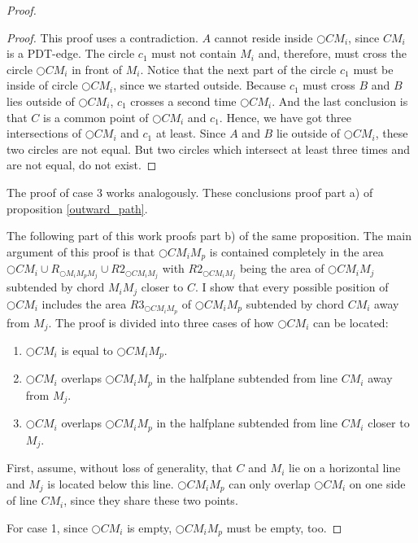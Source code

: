 \begin{proof}
\begin{proof}
This proof uses a contradiction. %
$A $ cannot reside inside $\bigcirc{CM_i} $, since $CM_i $ is a PDT-edge.
The circle $c_1 $ must not contain $M_i $ and, therefore, must cross the circle $\bigcirc{CM_i} $ in front of $M_i $.
Notice that the next part of the circle $c_1 $ must be inside of circle $\bigcirc{CM_i} $, since we started outside.
Because $c_1 $ must cross $B $ and $B $ lies outside of $\bigcirc{CM_i} $, $c_1 $ crosses a second time $\bigcirc{CM_i} $.
And the last conclusion is that $C $ is a common point of $\bigcirc{CM_i} $ and $c_1 $.
Hence, we have got three intersections of $\bigcirc{CM_i} $ and $c_1 $ at least.
Since $A $ and $B $ lie outside of $\bigcirc{CM_i} $, these two circles are not equal.
But two circles which intersect at least three times and are not equal, do not exist.
\end{proof}
The proof of case 3 works analogously.
These conclusions proof part a) of proposition \ref{outward_path}.

The following part of this work proofs part b) of the same proposition.
The main argument of this proof is that $\bigcirc{CM_iM_p} $ is contained completely in the area $\bigcirc{CM_i} \cup  R_{\bigcirc{M_iM_pM_j}} \cup R2_{\bigcirc{CM_iM_j}} $ with $R2_{\bigcirc{CM_iM_j}} $ being the area of $\bigcirc{CM_iM_j} $ subtended by chord $M_iM_j $ closer to $C $.
I show that every possible position of $\bigcirc{CM_i} $ includes the area $R3_{\bigcirc{CM_iM_p}} $ of $\bigcirc{CM_iM_p} $ subtended by chord $CM_i $ away from $M_j $.
The proof is divided into three cases of how $\bigcirc{CM_i} $ can be located:
\begin{enumerate}
\item $\bigcirc{CM_i} $ is equal to $\bigcirc{CM_iM_p} $.
\item $\bigcirc{CM_i} $ overlaps $\bigcirc{CM_iM_p} $ in the halfplane subtended from line $CM_i $ away from $M_j $.
\item $\bigcirc{CM_i} $ overlaps $\bigcirc{CM_iM_p} $ in the halfplane subtended from line $CM_i $ closer to $M_j $.
\end{enumerate}
First, assume, without loss of generality, that $C $ and $M_i $ lie on a horizontal line and $M_j $ is located below this line.
$\bigcirc{CM_iM_p} $ can only overlap $\bigcirc{CM_i} $ on one side of line $CM_i $, since they share these two points.

For case 1, since $\bigcirc{CM_i} $ is empty, $\bigcirc{CM_iM_p} $ must be empty, too.


\end{proof}
